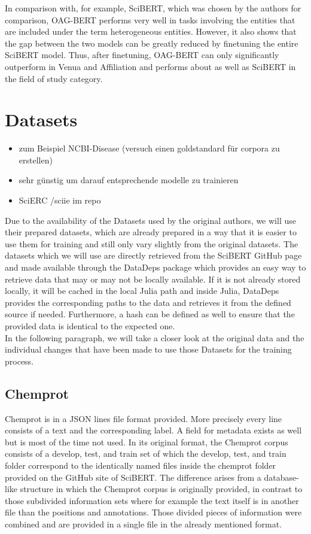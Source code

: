 	In comparison with, for example, SciBERT, which was chosen by the authors for comparison, OAG-BERT performs very well in tasks involving the entities that are included under the term heterogeneous entities. However, it also shows that the gap between the two models can be greatly reduced by finetuning the entire SciBERT model. Thus, after finetuning, OAG-BERT can only significantly outperform in Venua and Affiliation and performs about as well as SciBERT in the field of study category.\cite{Liu2021}
\section{Datasets}
\begin{itemize}
	\item zum Beispiel NCBI-Disease (versuch einen goldstandard für corpora zu erstellen)
	\item sehr günstig um darauf entsprechende modelle zu trainieren \cite{Dogan2014}
	\item SciERC /sciie im repo \cite{luan2018multitask}
\end{itemize}
\color{black}
Due to the availability of the Datasets used by the original authors, we will use their prepared datasets, which are already prepared in a way that it is easier to use them for training and still only vary slightly from the original datasets. The datasets which we will use are directly retrieved from the SciBERT GitHub page and made available through the DataDeps package which provides an easy way to retrieve data that may or may not be locally available. If it is not already stored locally, it will be cached in the local Julia path and inside Julia, DataDeps provides the corresponding paths to the data and retrieves it from the defined source if needed. Furthermore, a hash can be defined as well to ensure that the provided data is identical to the expected one.\cite{White2019}\\
In the following paragraph, we will take a closer look at the original data and the individual changes that have been made to use those Datasets for the training process.
\subsection{Chemprot}
Chemprot is in a JSON lines file format provided. More precisely every line consists of a text and the corresponding label. A field for metadata exists as well but is most of the time not used. In its original format, the Chemprot corpus consists of a develop, test, and train set of which the develop, test, and train folder correspond to the identically named files inside the chemprot folder provided on the GitHub site of SciBERT. The difference arises from a database-like structure in which the Chemprot corpus is originally provided, in contrast to those subdivided information sets where for example the text itself is in another file than the positions and annotations. Those divided pieces of information were combined and are provided in a single file in the already mentioned format. \cite{Beltagy2019,Wang2016}